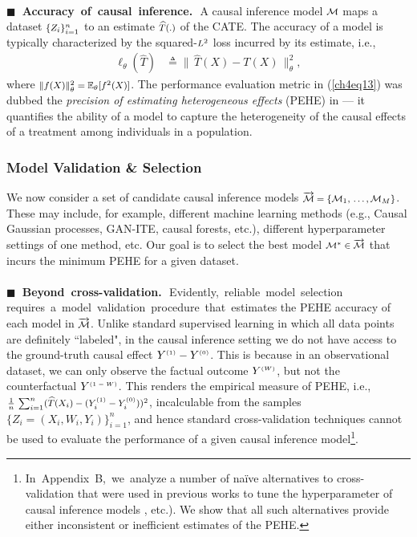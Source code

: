 \documentclass [PhD] {uclathes}
\begin{document}
\\
{\bf \mbox{\tiny $\blacksquare$}~Accuracy~of~causal~inference.}\,~A causal inference model $\mbox{\footnotesize $\mathcal{M}$}$ maps a dataset $\mbox{\footnotesize $\{Z_i\}^n_{i=1}$}$ to an estimate $\mbox{\footnotesize $\widehat{T}(.)$}$ of the CATE. The accuracy of a model is typically characterized by the squared-$\mbox{\footnotesize $L^2$}$ loss incurred by its estimate, i.e., 
\begin{align}
\boldsymbol{\ell}_{\theta}(\widehat{T}) &\triangleq \big\|\,\widehat{T}(X) - T(X)\,\big\|^2_{\theta},
\label{ch4eq13}
\end{align}  
where $\mbox{\footnotesize $\|f(X)\|^2_{\theta} = \mathbb{E}_{\theta}[f^2(X)]$}$. The performance evaluation metric in (\ref{ch4eq13}) was dubbed the {\it precision of estimating heterogeneous effects} (PEHE) in \cite{hill2011bayesian} --- it quantifies the ability of a model to capture the heterogeneity of the causal effects of a treatment among individuals in a population. 

\subsubsection{Model Validation \& Selection}
\label{ch4sec442} 
We now consider a set of candidate causal inference models $\mbox{\footnotesize $\overrightarrow{\mathcal{M}} = \{\mathcal{M}_1,\,.\,.\,.\,,\mathcal{M}_M\}$}$. These may include, for example, different machine learning methods (e.g., Causal Gaussian processes, GAN-ITE, causal forests, etc.), different hyperparameter settings of one method, etc. Our goal is to select the best model $\mbox{\footnotesize $\mathcal{M}^{*} \in \overrightarrow{\mathcal{M}}$}$ that incurs the minimum PEHE for a given dataset.\\ 
\\
{\bf \mbox{\tiny $\blacksquare$}~Beyond~cross-validation.}\,~Evidently,~reliable~model~selection requires~a~model~validation~procedure~that~estimates the PEHE accuracy of each model in $\mbox{\footnotesize $\overrightarrow{\mathcal{M}}$}$. Unlike standard supervised learning in which all data points are definitely ``labeled", in the causal inference setting we do not have access to the ground-truth causal effect \mbox{\footnotesize $Y^{\mbox{\tiny $(1)$}}-Y^{\mbox{\tiny $(0)$}}$}. This is because in an observational dataset, we can only observe the factual outcome \mbox{\footnotesize $Y^{\mbox{\tiny $(W)$}}$}, but not the counterfactual \mbox{\footnotesize $Y^{\mbox{\tiny $(1-W)$}}$}. This renders the empirical measure of PEHE, i.e., $\mbox{\footnotesize $\frac{1}{n}\,\sum^n_{i=1}(\widehat{T}(X_i)-(Y_i^{\mbox{\tiny $(1)$}}-Y_i^{\mbox{\tiny $(0)$}}))^2$}$, incalculable from the samples \mbox{\footnotesize $\{Z_i = (X_i, W_i, Y_i)\}^n_{i=1}$}, and hence standard cross-validation techniques cannot be used to evaluate the performance of a given causal inference model\footnote{In~Appendix~B,~we~analyze a number of na\"ive alternatives to cross-validation that were used in previous works to tune the hyperparameter of causal inference models \cite{shalit2016estimating,shimodaira2000improving}, etc.). We show that all such alternatives provide either inconsistent or inefficient estimates of the PEHE.}.
\end{document}
